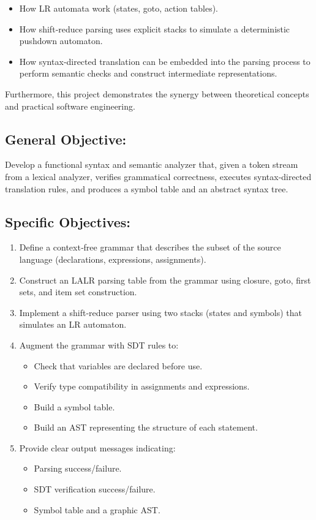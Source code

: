 \documentclass[letterpaper,12pt,oneside]{article}
\begin{document}
	\begin{itemize}
		\item How LR automata work (states, goto, action tables).
		\item How shift‑reduce parsing uses explicit stacks to simulate a deterministic pushdown automaton.
		\item How syntax‑directed translation can be embedded into the parsing process to perform semantic checks and construct intermediate representations.
	\end{itemize}
	
	Furthermore, this project demonstrates the synergy between theoretical concepts and practical software engineering.
	
	\noindent\subsection*{General Objective:}
	
	Develop a functional syntax and semantic analyzer that, given a token stream from a lexical analyzer, verifies grammatical correctness, executes syntax‑directed translation rules, and produces a symbol table and an abstract syntax tree.
	
	\noindent\subsection*{Specific Objectives:}
	
	\begin{enumerate}
		\item Define a context‑free grammar that describes the subset of the source language (declarations, expressions, assignments).
		\item Construct an LALR parsing table from the grammar using closure, goto, first sets, and item set construction.
		\item Implement a shift‑reduce parser using two stacks (states and symbols) that simulates an LR automaton.
		\item Augment the grammar with SDT rules to:
			\begin{itemize}
				\item Check that variables are declared before use.
				\item Verify type compatibility in assignments and expressions.
				\item Build a symbol table.
				\item Build an AST representing the structure of each statement.
			\end{itemize}
		\item Provide clear output messages indicating:
			\begin{itemize}
				\item Parsing success/failure.
				\item SDT verification success/failure.
				\item Symbol table and a graphic AST.
			\end{itemize}
	\end{enumerate}
	
\end{document}
